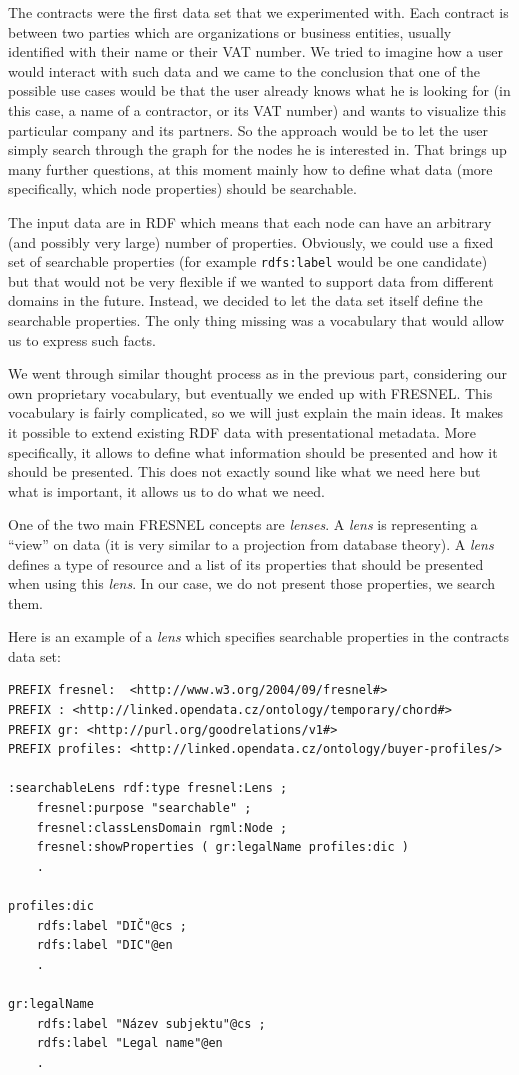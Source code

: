 The contracts were the first data set that we experimented with. Each contract is between two parties which are organizations or business entities, usually identified with their name or their VAT number. We tried to imagine how a user would interact with such data and we came to the conclusion that one of the possible use cases would be that the user already knows what he is looking for (in this case, a name of a contractor, or its VAT number) and wants to visualize this particular company and its partners. So the approach would be to let the user simply search through the graph for the nodes he is interested in. That brings up many further questions, at this moment mainly how to define what data (more specifically, which node properties) should be searchable.

The input data are in RDF which means that each node can have an arbitrary (and possibly very large) number of properties. Obviously, we could use a fixed set of searchable properties (for example \texttt{rdfs:label} would be one candidate) but that would not be very flexible if we wanted to support data from different domains in the future. Instead, we decided to let the data set itself define the searchable properties. The only thing missing was a vocabulary that would allow us to express such facts.

We went through similar thought process as in the previous part, considering our own proprietary vocabulary, but eventually we ended up with FRESNEL. This vocabulary is fairly complicated, so we will just explain the main ideas. It makes it possible to extend existing RDF data with presentational metadata. More specifically, it allows to define what information should be presented and how it should be presented. This does not exactly sound like what we need here but what is important, it allows us to do what we need.

One of the two main FRESNEL concepts are \emph{lenses}. A \emph{lens} is representing a “view” on data (it is very similar to a projection from database theory). A \emph{lens} defines a type of resource and a list of its properties that should be presented when using this \emph{lens}. In our case, we do not present those properties, we search them.

Here is an example of a \emph{lens} which specifies searchable properties in the contracts data set:

\begin{verbatim}
PREFIX fresnel:  <http://www.w3.org/2004/09/fresnel#>
PREFIX : <http://linked.opendata.cz/ontology/temporary/chord#>
PREFIX gr: <http://purl.org/goodrelations/v1#>
PREFIX profiles: <http://linked.opendata.cz/ontology/buyer-profiles/>

:searchableLens rdf:type fresnel:Lens ;
    fresnel:purpose "searchable" ;
    fresnel:classLensDomain rgml:Node ;
    fresnel:showProperties ( gr:legalName profiles:dic ) 
    .
    
profiles:dic
    rdfs:label "DIČ"@cs ;
    rdfs:label "DIC"@en 
    .
    
gr:legalName
    rdfs:label "Název subjektu"@cs ;
    rdfs:label "Legal name"@en 
    .
\end{verbatim}

